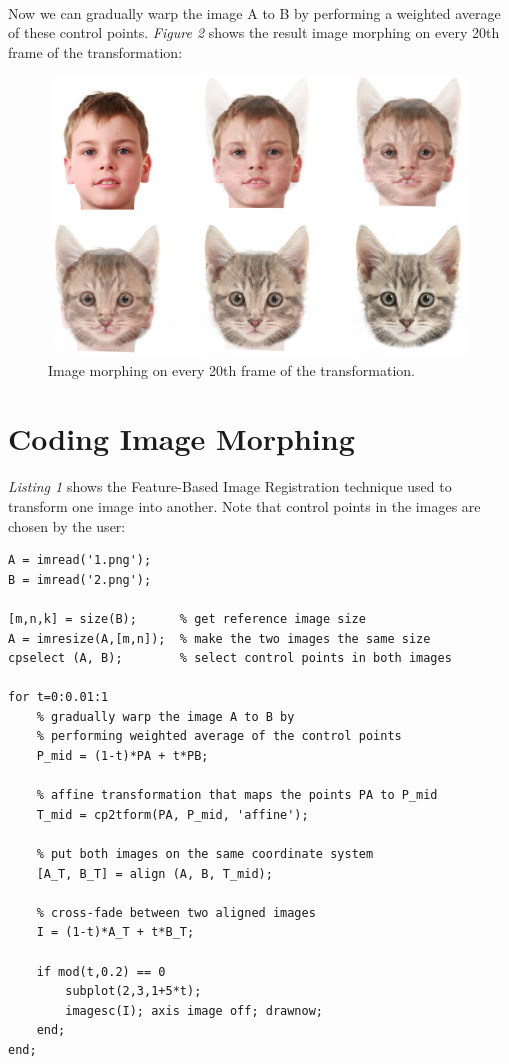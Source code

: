 \documentclass[a4paper,11pt]{article}
\begin{document}
 \\
Now we can gradually warp the image A to B by performing a weighted average of these control points. \emph{Figure 2} shows the result image morphing on every 20th frame of the transformation:

\begin{figure}[!htb]
  \centering
  \includegraphics[width=14cm, height=7.4cm]{1.png}
  \caption{\small Image morphing on every 20th frame of the transformation.}
\end{figure}

\newpage
\section*{Coding Image Morphing}
\emph{Listing 1} shows the Feature-Based Image Registration technique used to transform one image into another. Note that control points in the images are chosen by the user: \\
\begin{lstlisting}[caption={Image registration technique used to transform image A into image B},captionpos=b,style=Matlab-editor]
A = imread('1.png');
B = imread('2.png');

[m,n,k] = size(B);      % get reference image size
A = imresize(A,[m,n]);  % make the two images the same size
cpselect (A, B);        % select control points in both images

for t=0:0.01:1
    % gradually warp the image A to B by
    % performing weighted average of the control points
    P_mid = (1-t)*PA + t*PB;
    
    % affine transformation that maps the points PA to P_mid         
    T_mid = cp2tform(PA, P_mid, 'affine');
    
    % put both images on the same coordinate system
    [A_T, B_T] = align (A, B, T_mid);
    
    % cross-fade between two aligned images
    I = (1-t)*A_T + t*B_T;

    if mod(t,0.2) == 0
        subplot(2,3,1+5*t);
        imagesc(I); axis image off; drawnow;
    end;
end;

\end{lstlisting}
\end{document}
